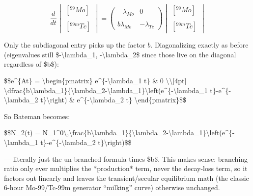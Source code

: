 \begin{equation}
	\dfrac{d}{dt} 
	\begin{vmatrix} [^{99}Mo] \\ \\ [^{99m}Tc] \end{vmatrix} = 
	\begin{pmatrix} -\lambda_{Mo} & 0 \\ & \\b\lambda_{Mo} & -\lambda_{Tc} \end{pmatrix}
	\begin{vmatrix} [^{99}Mo] \\ \\ [^{99m}Tc] \end{vmatrix}
	\label{eq:matrix_original_system}
\end{equation}


Only the subdiagonal entry picks up the factor $b$. Diagonalizing exactly as before (eigenvalues still \$-\textbackslash{}lambda\_1, -\textbackslash{}lambda\_2\$ since those live on the diagonal regardless of \$b\$):

\$\$e\^{}\{At\} = \textbackslash{}begin\{pmatrix\} e\^{}\{-\textbackslash{}lambda\_1 t\} \& 0 \textbackslash{}\textbackslash{}[4pt] \textbackslash{}dfrac\{b\textbackslash{}lambda\_1\}\{\textbackslash{}lambda\_2-\textbackslash{}lambda\_1\}\textbackslash{}left(e\^{}\{-\textbackslash{}lambda\_1 t\}-e\^{}\{-\textbackslash{}lambda\_2 t\}\textbackslash{}right) \& e\^{}\{-\textbackslash{}lambda\_2 t\} \textbackslash{}end\{pmatrix\}\$\$

So Bateman becomes:

\$\$N\_2(t) = N\_1\^{}0\textbackslash{},\textbackslash{}frac\{b\textbackslash{}lambda\_1\}\{\textbackslash{}lambda\_2-\textbackslash{}lambda\_1\}\textbackslash{}left(e\^{}\{-\textbackslash{}lambda\_1 t\}-e\^{}\{-\textbackslash{}lambda\_2 t\}\textbackslash{}right)\$\$

— literally just the un-branched formula times \$b\$. This makes sense: branching ratio only ever multiplies the *production* term, never the decay-loss term, so it factors out linearly and leaves the transient/secular equilibrium math (the classic 6-hour Mo-99/Tc-99m generator ``milking'' curve) otherwise unchanged.

